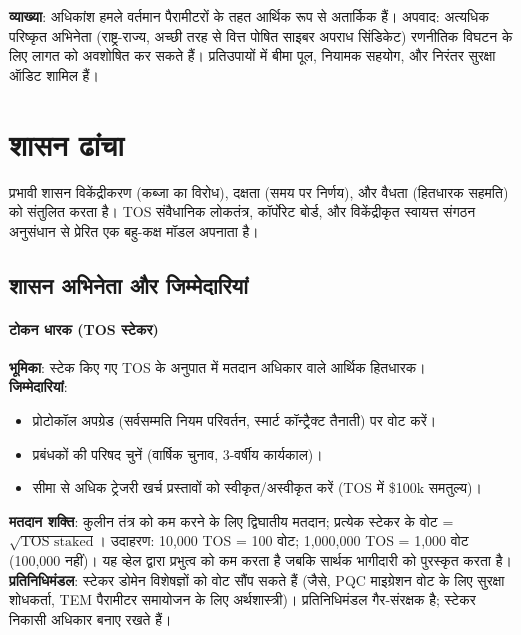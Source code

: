 \documentclass[11pt]{article}
\begin{document}
\begin{itemize}[noitemsep]
\begin{itemize}[noitemsep]
\begin{itemize}[noitemsep]
\begin{itemize}[noitemsep]
\begin{itemize}[noitemsep]
\textbf{व्याख्या}: अधिकांश हमले वर्तमान पैरामीटरों के तहत आर्थिक रूप से अतार्किक हैं। अपवाद: अत्यधिक परिष्कृत अभिनेता (राष्ट्र-राज्य, अच्छी तरह से वित्त पोषित साइबर अपराध सिंडिकेट) रणनीतिक विघटन के लिए लागत को अवशोषित कर सकते हैं। प्रतिउपायों में बीमा पूल, नियामक सहयोग, और निरंतर सुरक्षा ऑडिट शामिल हैं।

\section{शासन ढांचा}
\label{sec:governance}

प्रभावी शासन विकेंद्रीकरण (कब्जा का विरोध), दक्षता (समय पर निर्णय), और वैधता (हितधारक सहमति) को संतुलित करता है। TOS संवैधानिक लोकतंत्र, कॉर्पोरेट बोर्ड, और विकेंद्रीकृत स्वायत्त संगठन अनुसंधान से प्रेरित एक बहु-कक्ष मॉडल अपनाता है।

\subsection{शासन अभिनेता और जिम्मेदारियां}

\paragraph{टोकन धारक (TOS स्टेकर)}
\textbf{भूमिका}: स्टेक किए गए TOS के अनुपात में मतदान अधिकार वाले आर्थिक हितधारक।\\
\textbf{जिम्मेदारियां}:
\begin{itemize}[noitemsep]
  \item प्रोटोकॉल अपग्रेड (सर्वसम्मति नियम परिवर्तन, स्मार्ट कॉन्ट्रैक्ट तैनाती) पर वोट करें।
  \item प्रबंधकों की परिषद चुनें (वार्षिक चुनाव, 3-वर्षीय कार्यकाल)।
  \item सीमा से अधिक ट्रेजरी खर्च प्रस्तावों को स्वीकृत/अस्वीकृत करें (TOS में \$100k समतुल्य)।
\end{itemize}
\textbf{मतदान शक्ति}: कुलीन तंत्र को कम करने के लिए द्विघातीय मतदान; प्रत्येक स्टेकर के वोट = $\sqrt{\text{TOS staked}}$। उदाहरण: 10,000 TOS = 100 वोट; 1,000,000 TOS = 1,000 वोट (100,000 नहीं)। यह व्हेल द्वारा प्रभुत्व को कम करता है जबकि सार्थक भागीदारी को पुरस्कृत करता है।\\
\textbf{प्रतिनिधिमंडल}: स्टेकर डोमेन विशेषज्ञों को वोट सौंप सकते हैं (जैसे, PQC माइग्रेशन वोट के लिए सुरक्षा शोधकर्ता, TEM पैरामीटर समायोजन के लिए अर्थशास्त्री)। प्रतिनिधिमंडल गैर-संरक्षक है; स्टेकर निकासी अधिकार बनाए रखते हैं।


\end{itemize}
\end{itemize}
\end{itemize}
\end{itemize}
\end{itemize}
\end{document}
